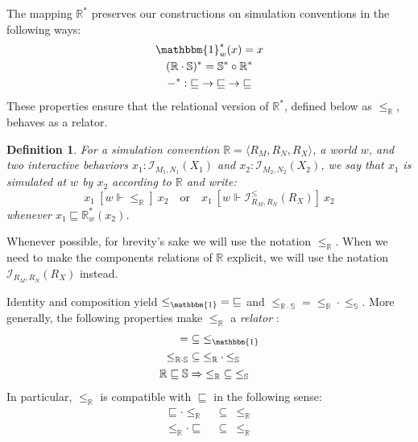 \documentclass{article}
\newtheorem{definition}{Definition}
\newcommand{\ifr}[1]{\ [{#1}]\ }
\begin{document}
The mapping $\mathbb{R}^*$ preserves our constructions
on simulation conventions in the following ways:
\begin{gather*}
\mathbbm{1}^*_w(x) = x \\
(\mathbb{R} \cdot \mathbb{S})^* = \mathbb{S}^* \circ \mathbb{R}^* \\
-^* : {\sqsubseteq} \rightarrow {\sqsubseteq} \rightarrow {\sqsubseteq}
\end{gather*}
These properties ensure that
the relational version of $\mathbb{R}^*$,
defined below as $\le_\mathbb{R}$,
behaves as a relator.

\begin{definition}
For a simulation convention $\mathbb{R} = \langle R_M, R_N, R_X \rangle$,
a world $w$,
and two interactive behaviors
$x_1 : \mathcal{I}_{M_1, N_1}(X_1)$ and
$x_2 : \mathcal{I}_{M_2, N_2}(X_2)$,
we say that
\emph{$x_1$ is simulated at $w$ by $x_2$ according to $\mathbb{R}$}
and write:
\[
    x_1 \ifr{w \Vdash {\le}_\mathbb{R}} x_2
    \quad \mbox{or} \quad
    x_1 \ifr{w \Vdash \mathcal{I}^\le_{R_M,R_N}(R_X)} x_2
\]
whenever $x_1 \sqsubseteq \mathbb{R}^*_w(x_2)$.
\end{definition}

Whenever possible,
for brevity's sake we will use the notation $\le_\mathbb{R}$.
When we need to make the components relations of $\mathbb{R}$ explicit,
we will use the notation $\mathcal{I}_{R_M,R_N}(R_X)$ instead.

Identity and composition yield
${\le}_\mathbbm{1} = {\sqsubseteq}$ and
${\le}_{\mathbb{R} \cdot \mathbb{S}} =
 {\le}_\mathbb{R} \cdot {\le}_\mathbb{S}$.
More generally,
the following properties make
$\le_\mathbb{R}$ a \emph{relator} \cite{something}:
\begin{align*}
  {=} &\subseteq {\le}_\mathbbm{1} \\
  {\le}_{\mathbb{R} \cdot \mathbb{S}} &\subseteq
    {\le}_\mathbb{R} \cdot {\le}_\mathbb{S} \\
  \mathbb{R} \sqsubseteq \mathbb{S} &\Rightarrow
    {\le}_\mathbb{R} \subseteq {\le}_\mathbb{S}
\end{align*}
In particular, $\le_\mathbb{R}$ is compatible with $\sqsubseteq$
in the following sense:
\begin{align*}
    {\sqsubseteq} \cdot {\le}_\mathbb{R} &\:\subseteq\: {\le}_\mathbb{R} \\
    {\le}_\mathbb{R} \cdot {\sqsubseteq} &\:\subseteq\: {\le}_\mathbb{R}
\end{align*}
\end{document}
